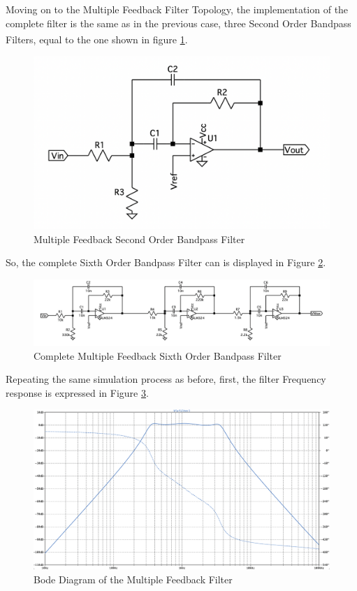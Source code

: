 Moving on to the Multiple Feedback Filter Topology, the implementation of the complete filter is the same as in the previous case, three Second Order Bandpass Filters, equal to the one shown in figure \ref{fig:SingleMFB}\textsuperscript{\cite{Active-Filter-Design-Techniques}}.

\begin{figure}[H]
    \centering
    \includegraphics*[scale = 0.3]{Images/SingleMFB.png}
    \caption{Multiple Feedback Second Order Bandpass Filter}
    \label{fig:SingleMFB}
\end{figure}

So, the complete Sixth Order Bandpass Filter can is displayed in Figure \ref{fig:MFBFilter}.

\begin{figure}[H]
    \centering
    \includegraphics*[scale = 0.4]{Images/MFBFilter.png}
    \caption{Complete Multiple Feedback Sixth Order Bandpass Filter}
    \label{fig:MFBFilter}
\end{figure}

Repeating the same simulation process as before, first, the filter Frequency response is expressed in Figure \ref{fig:SimMFBFilter}.

\begin{figure}[H]
    \centering
    \includegraphics*[scale = 0.25]{Images/SimMFBFilter.png}
    \caption{Bode Diagram of the Multiple Feedback Filter}
    \label{fig:SimMFBFilter}
\end{figure}

